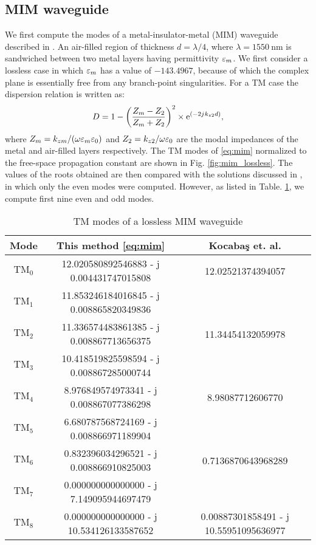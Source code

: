 \documentclass[12pt]{article}
\begin{document}
\subsection{MIM waveguide}
%
%
We first compute the modes of a metal-insulator-metal (MIM) waveguide described in \cite{Kocabas2009}. An air-filled region of thickness $d = \lambda/4$, where $\lambda = \SI{1550}{\nm}$ is sandwiched between two metal layers having permittivity $\varepsilon_m$. We first consider a lossless case in which $\varepsilon_m$ has a value of $-143.4967$, because of which the complex plane is essentially free from any branch-point singularities. For a TM case the dispersion relation is written as:
%
\begin{equation}
  D =  1 - \left(\frac{Z_m - Z_2}{Z_m + Z_2}\right)^2 \times \mathrm{e}^{(-2j\mkern1mu  k_{z2} d)},
  \label{eq:mim}
\end{equation}
%
where $Z_m = k_{zm}/(\omega \varepsilon_m \varepsilon_0)$ and $Z_2 = k_{z2}/{\omega \varepsilon_0}$ are the modal impedances of the metal and air-filled layers respectively. The TM modes of \eqref{eq:mim} normalized to the free-space propagation constant are shown in Fig. \ref{fig:mim_lossless}. The values of the roots obtained are then compared with the solutions discussed in \cite{Kocabas2009}, in which only the even modes were computed. However, as listed in Table. \ref{tab:kocabas_lossless}, we compute first nine even and odd modes.
%
\begin{table}[!htbp]
\begin{center}
 \begin{tabular}{||c |c |c||}
 \hline
 Mode & This method \eqref{eq:mim} & Kocaba{\c{s}} et. al. \cite{Kocabas2009} \\ [0.5ex]
 \hline\hline
 $\text{TM}_0$ & \num{12.020580892546883 - j 0.004431747015808} & \num{12.02521374394057} \\
 $\text{TM}_1$ & \num{11.853246184016845 - j 0.008865820349836} & \num{} \\
 $\text{TM}_2$ & \num{11.336574483861385 - j 0.008867713656375} & \num{11.34454132059978} \\
 $\text{TM}_3$ & \num{10.418519825598594 - j 0.008867285000744} & \num{} \\
 $\text{TM}_4$ & \num{8.976849574973341 - j 0.008867077386298} & \num{8.98087712606770} \\
 $\text{TM}_5$ & \num{6.680787568724169 - j 0.008866971189904} & \num{} \\
 $\text{TM}_6$ & \num{0.832396034296521 - j 0.008866910825003} & \num{0.7136870643968289} \\
 $\text{TM}_7$ & \num{0.000000000000000 - j 7.149095944697479} & \num{} \\
 $\text{TM}_8$ & \num{0.000000000000000 - j 10.534126133587652} & \num{0.00887301858491 - j 10.55951095636977} \\
 \hline
 \end{tabular}
  \end{center}
 \caption{TM modes of a lossless MIM waveguide}
 \label{tab:kocabas_lossless}
\end{table}
%
\end{document}
